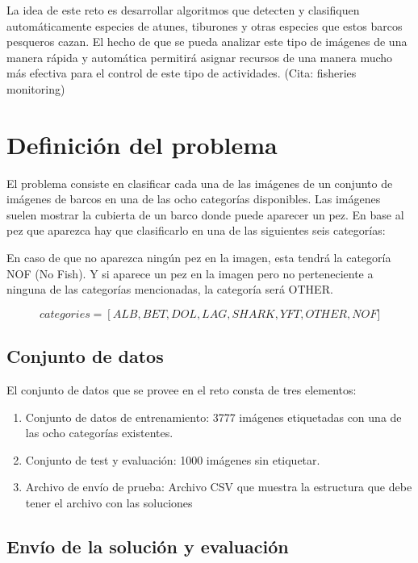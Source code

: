 La idea de este reto es desarrollar algoritmos que detecten y clasifiquen automáticamente especies de atunes, tiburones y otras especies que estos barcos pesqueros cazan. El hecho de que se pueda analizar este tipo de imágenes de una manera rápida y automática permitirá asignar recursos de una manera mucho más efectiva para el control de este tipo de actividades. (Cita: fisheries monitoring)

\section{Definición del problema}

El problema consiste en clasificar cada una de las imágenes de un conjunto de imágenes de barcos en una de las ocho categorías disponibles. Las imágenes suelen mostrar la cubierta de un barco donde puede aparecer un pez. En base al pez que aparezca hay que clasificarlo en una de las siguientes seis categorías:

\begin{center}
\end{center}

En caso de que no aparezca ningún pez en la imagen, esta tendrá la categoría NOF (No Fish). Y si aparece un pez en la imagen pero no perteneciente a ninguna de las categorías mencionadas, la categoría será OTHER.

\[
  categories =
  \left[ALB, BET, DOL, LAG, SHARK, YFT, OTHER, NOF]
\]

\subsection{Conjunto de datos}

El conjunto de datos que se provee en el reto consta de tres elementos:

\begin{enumerate}
  \item{Conjunto de datos de entrenamiento: 3777 imágenes etiquetadas con una de las ocho categorías existentes.}
  \item{Conjunto de test y evaluación: 1000 imágenes sin etiquetar.}
  \item{Archivo de envío de prueba: Archivo CSV que muestra la estructura que debe tener el archivo con las soluciones}
\end{enumerate}

\subsection{Envío de la solución y evaluación}
\label{sec:envio-y-eval}

